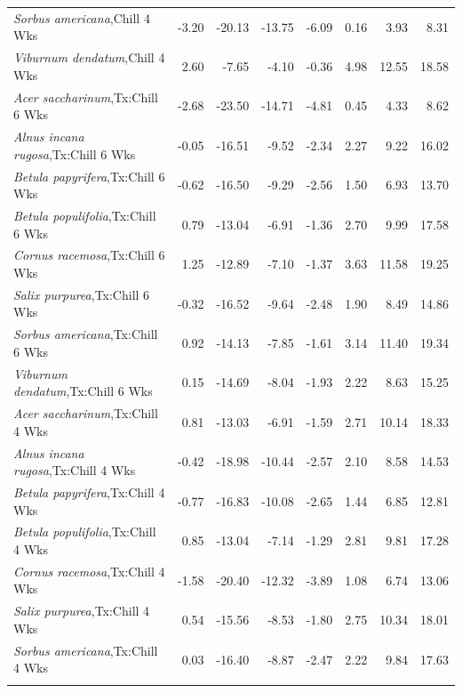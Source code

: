 \documentclass{article}\usepackage[]{graphicx}\usepackage[]{color}
\begin{document}
\begin{longtable}{lrrrrrrr}
  \textit{Sorbus americana},Chill 4 Wks & -3.20 & -20.13 & -13.75 & -6.09 & 0.16 & 3.93 & 8.31 \\ 
  \textit{Viburnum dendatum},Chill 4 Wks & 2.60 & -7.65 & -4.10 & -0.36 & 4.98 & 12.55 & 18.58 \\ 
  \textit{Acer saccharinum},Tx:Chill 6 Wks & -2.68 & -23.50 & -14.71 & -4.81 & 0.45 & 4.33 & 8.62 \\ 
  \textit{Alnus incana rugosa},Tx:Chill 6 Wks & -0.05 & -16.51 & -9.52 & -2.34 & 2.27 & 9.22 & 16.02 \\ 
  \textit{Betula papyrifera},Tx:Chill 6 Wks & -0.62 & -16.50 & -9.29 & -2.56 & 1.50 & 6.93 & 13.70 \\ 
  \textit{Betula populifolia},Tx:Chill 6 Wks & 0.79 & -13.04 & -6.91 & -1.36 & 2.70 & 9.99 & 17.58 \\ 
  \textit{Cornus racemosa},Tx:Chill 6 Wks & 1.25 & -12.89 & -7.10 & -1.37 & 3.63 & 11.58 & 19.25 \\ 
  \textit{Salix purpurea},Tx:Chill 6 Wks & -0.32 & -16.52 & -9.64 & -2.48 & 1.90 & 8.49 & 14.86 \\ 
  \textit{Sorbus americana},Tx:Chill 6 Wks & 0.92 & -14.13 & -7.85 & -1.61 & 3.14 & 11.40 & 19.34 \\ 
  \textit{Viburnum dendatum},Tx:Chill 6 Wks & 0.15 & -14.69 & -8.04 & -1.93 & 2.22 & 8.63 & 15.25 \\ 
  \textit{Acer saccharinum},Tx:Chill 4 Wks & 0.81 & -13.03 & -6.91 & -1.59 & 2.71 & 10.14 & 18.33 \\ 
  \textit{Alnus incana rugosa},Tx:Chill 4 Wks & -0.42 & -18.98 & -10.44 & -2.57 & 2.10 & 8.58 & 14.53 \\ 
  \textit{Betula papyrifera},Tx:Chill 4 Wks & -0.77 & -16.83 & -10.08 & -2.65 & 1.44 & 6.85 & 12.81 \\ 
  \textit{Betula populifolia},Tx:Chill 4 Wks & 0.85 & -13.04 & -7.14 & -1.29 & 2.81 & 9.81 & 17.28 \\ 
  \textit{Cornus racemosa},Tx:Chill 4 Wks & -1.58 & -20.40 & -12.32 & -3.89 & 1.08 & 6.74 & 13.06 \\ 
  \textit{Salix purpurea},Tx:Chill 4 Wks & 0.54 & -15.56 & -8.53 & -1.80 & 2.75 & 10.34 & 18.01 \\ 
  \textit{Sorbus americana},Tx:Chill 4 Wks & 0.03 & -16.40 & -8.87 & -2.47 & 2.22 & 9.84 & 17.63 \\ 
   \hline
\hline
\label{tab:suppmodgs}
\end{longtable}
\end{document}
